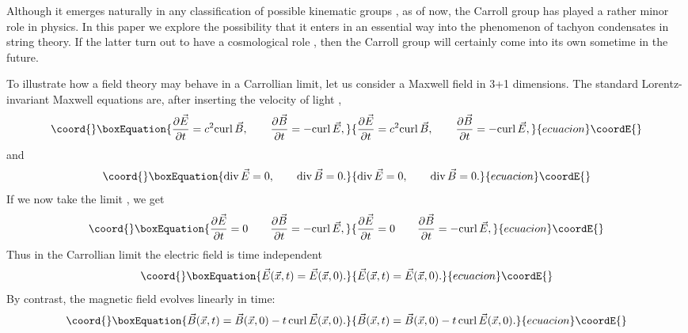 \documentclass[a4paper,12pt]{article}
\begin{document}
Although it emerges naturally in any classification of possible
kinematic groups \cite{Bacry, Nuyts}, as of now,  the Carroll
group has played a rather minor role in physics. In this paper we
explore the possibility that it enters in an essential way into
the phenomenon of tachyon condensates in string theory. If the
latter  turn out to have a cosmological role \cite{Gibbons1,cos}, then
the Carroll group will certainly come into its own sometime in the
future.

To illustrate  how a field theory may behave in a Carrollian limit,
let us consider a Maxwell field in 3+1 dimensions.
The standard Lorentz-invariant Maxwell equations are, after inserting
the velocity of light \coordHE{}, 
\begin{equation}\coord{}\boxEquation{
\frac{\partial {\vec E}}{\partial t } = c^2   {\rm curl} \thinspace 
{\vec B},
\qquad  \frac{\partial  {\vec B}}{\partial t} = - {\rm curl}
\thinspace {\vec E},  
}{
\frac{\partial {\vec E}}{\partial t } = c^2   {\rm curl} \thinspace 
{\vec B},
\qquad  \frac{\partial  {\vec B}}{\partial t} = - {\rm curl}
\thinspace {\vec E},  
}{ecuacion}\coordE{}\end{equation} 
and
\begin{equation}\coord{}\boxEquation{
{\rm div} \thinspace {\vec E}=0, \qquad {\rm div} \thinspace {\vec B}=0.
}{
{\rm div} \thinspace {\vec E}=0, \qquad {\rm div} \thinspace {\vec B}=0.
}{ecuacion}\coordE{}\end{equation} 
If we now take the limit \coordHE{}, we get
\begin{equation}\coord{}\boxEquation{
\frac{\partial {\vec E} }{ \partial t } = 0
\qquad  \frac{\partial  {\vec B} }{ \partial t} = - {\rm curl}
\thinspace {\vec E},  
}{
\frac{\partial {\vec E} }{ \partial t } = 0
\qquad  \frac{\partial  {\vec B} }{ \partial t} = - {\rm curl}
\thinspace {\vec E},  
}{ecuacion}\coordE{}\end{equation}
Thus in the Carrollian limit the electric field \coordHE{} is time
independent
\begin{equation}\coord{}\boxEquation{
{\vec E({\vec x}, t) } = {\vec E} ({\vec x}, 0). 
}{
{\vec E({\vec x}, t) } = {\vec E} ({\vec x}, 0). 
}{ecuacion}\coordE{}\end{equation}
By contrast, the magnetic field \coordHE{} evolves linearly in time:
\begin{equation}\coord{}\boxEquation{
{\vec B}({\vec x}, t)= {\vec B} ( {\vec x}, 0) - t \thinspace {\rm curl} 
\thinspace {\vec
E} ({\vec x}, 0).
}{
{\vec B}({\vec x}, t)= {\vec B} ( {\vec x}, 0) - t \thinspace {\rm curl} 
\thinspace {\vec
E} ({\vec x}, 0).
}{ecuacion}\coordE{}\end{equation} 
\end{document}

